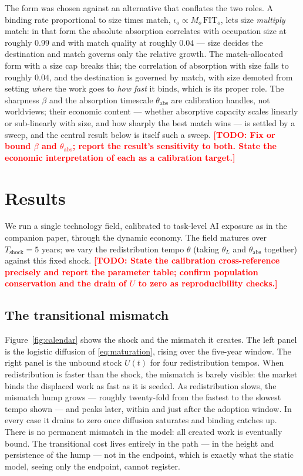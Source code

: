 \documentclass[12pt, a4paper]{article}
\newcommand{\todo}[1]{\textcolor{red}{\textbf{[TODO: #1]}}}
\begin{document}
The form was chosen against an alternative that conflates the two roles.
A binding rate proportional to size times match, $\iota_o \propto
M_o\,\mathrm{FIT}_o$, lets size \emph{multiply} match: in that form the
absolute absorption correlates with occupation size at roughly $0.99$ and
with match quality at roughly $0.04$ --- size decides the destination and
match governs only the relative growth. The match-allocated form with a
size cap breaks this; the correlation of absorption with size falls to
roughly $0.04$, and the destination is governed by match, with size
demoted from setting \emph{where} the work goes to \emph{how fast} it
binds, which is its proper role. The sharpness $\beta$ and the absorption
timescale $\theta_{\text{abs}}$ are calibration handles, not worldviews;
their economic content --- whether absorptive capacity scales linearly or
sub-linearly with size, and how sharply the best match wins --- is settled
by a sweep, and the central result below is itself such a sweep.
\todo{Fix or bound $\beta$ and $\theta_{\text{abs}}$; report the result's
sensitivity to both. State the economic interpretation of each as a
calibration target.}

\section{Results}
\label{sec:results}

We run a single technology field, calibrated to task-level AI exposure as
in the companion paper, through the dynamic economy. The field matures
over $T_{\text{shock}}=5$ years; we vary the redistribution tempo
$\theta$ (taking $\theta_L$ and $\theta_{\text{abs}}$ together) against
this fixed shock. \todo{State the calibration cross-reference precisely
and report the parameter table; confirm population conservation and the
drain of $U$ to zero as reproducibility checks.}

\subsection{The transitional mismatch}
\label{sec:transitional}

Figure~\ref{fig:calendar} shows the shock and the mismatch it creates.
The left panel is the logistic diffusion of \eqref{eq:maturation}, rising
over the five-year window. The right panel is the unbound stock $U(t)$
for four redistribution tempos. When redistribution is faster than the
shock, the mismatch is barely visible: the market binds the displaced
work as fast as it is seeded. As redistribution slows, the mismatch hump
grows --- roughly twenty-fold from the fastest to the slowest tempo shown
--- and peaks later, within and just after the adoption window. In every
case it drains to zero once diffusion saturates and binding catches up.
There is no permanent mismatch in the model: all created work is
eventually bound. The transitional cost lives entirely in the path --- in
the height and persistence of the hump --- not in the endpoint, which is
exactly what the static model, seeing only the endpoint, cannot register.
\end{document}

